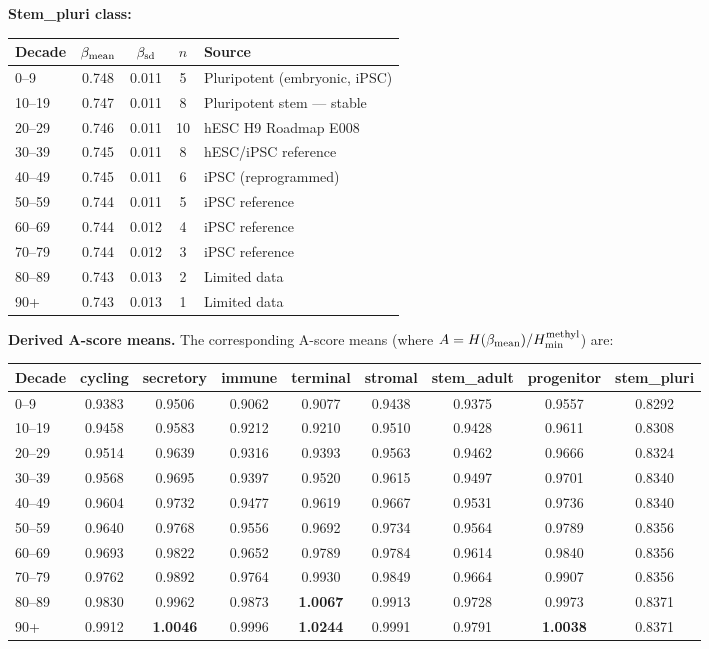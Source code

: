 \documentclass[12pt,a4paper]{article}
\begin{document}
\textbf{Stem\_pluri class:}

\begin{center}
\footnotesize
\begin{tabular}{lcccp{4cm}}
\toprule
Decade & $\beta_{\rm mean}$ & $\beta_{\rm sd}$ & $n$ & Source \\
\midrule
0--9   & 0.748 & 0.011 & 5 & Pluripotent (embryonic, iPSC) \\
10--19 & 0.747 & 0.011 & 8 & Pluripotent stem — stable \\
20--29 & 0.746 & 0.011 & 10 & hESC H9 Roadmap E008 \\
30--39 & 0.745 & 0.011 & 8 & hESC/iPSC reference \\
40--49 & 0.745 & 0.011 & 6 & iPSC (reprogrammed) \\
50--59 & 0.744 & 0.011 & 5 & iPSC reference \\
60--69 & 0.744 & 0.012 & 4 & iPSC reference \\
70--79 & 0.744 & 0.012 & 3 & iPSC reference \\
80--89 & 0.743 & 0.013 & 2 & Limited data \\
90+    & 0.743 & 0.013 & 1 & Limited data \\
\bottomrule
\end{tabular}
\end{center}

\textbf{Derived A-score means.} The corresponding A-score means
(where $A = H(\beta_{\rm mean})/H_{\rm min}^{\rm methyl}$) are:

\begin{center}
\footnotesize
\begin{tabular}{lcccccccc}
\toprule
Decade & cycling & secretory & immune & terminal & stromal & stem\_adult & progenitor & stem\_pluri \\
\midrule
0--9   & 0.9383 & 0.9506 & 0.9062 & 0.9077 & 0.9438 & 0.9375 & 0.9557 & 0.8292 \\
10--19 & 0.9458 & 0.9583 & 0.9212 & 0.9210 & 0.9510 & 0.9428 & 0.9611 & 0.8308 \\
20--29 & 0.9514 & 0.9639 & 0.9316 & 0.9393 & 0.9563 & 0.9462 & 0.9666 & 0.8324 \\
30--39 & 0.9568 & 0.9695 & 0.9397 & 0.9520 & 0.9615 & 0.9497 & 0.9701 & 0.8340 \\
40--49 & 0.9604 & 0.9732 & 0.9477 & 0.9619 & 0.9667 & 0.9531 & 0.9736 & 0.8340 \\
50--59 & 0.9640 & 0.9768 & 0.9556 & 0.9692 & 0.9734 & 0.9564 & 0.9789 & 0.8356 \\
60--69 & 0.9693 & 0.9822 & 0.9652 & 0.9789 & 0.9784 & 0.9614 & 0.9840 & 0.8356 \\
70--79 & 0.9762 & 0.9892 & 0.9764 & 0.9930 & 0.9849 & 0.9664 & 0.9907 & 0.8356 \\
80--89 & 0.9830 & 0.9962 & 0.9873 & \textbf{1.0067} & 0.9913 & 0.9728 & 0.9973 & 0.8371 \\
90+    & 0.9912 & \textbf{1.0046} & 0.9996 & \textbf{1.0244} & 0.9991 & 0.9791 & \textbf{1.0038} & 0.8371 \\
\bottomrule
\end{tabular}
\end{center}
\end{document}

